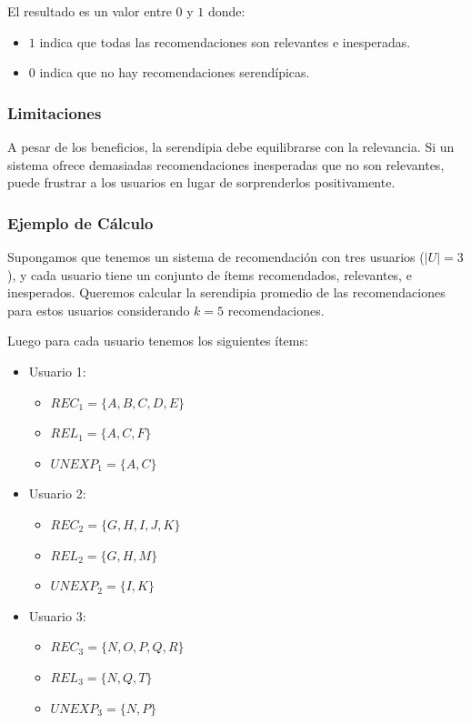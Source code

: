 \documentclass[11pt,a4paper,twoside]{thesis}
\begin{document}
El resultado es un valor entre $0$ y $1$ donde:
\begin{itemize}
	\item $1$ indica que todas las recomendaciones son relevantes e inesperadas.
	\item $0$ indica que no hay recomendaciones serendípicas.
\end{itemize}



\subsubsection*{Limitaciones}

A pesar de los beneficios, la serendipia debe equilibrarse con la relevancia. Si un sistema ofrece demasiadas recomendaciones inesperadas que no son relevantes, puede frustrar a los usuarios en lugar de sorprenderlos positivamente.


\subsubsection*{Ejemplo de Cálculo}

Supongamos que tenemos un sistema de recomendación con tres usuarios (\( |U| = 3 \)), y cada usuario tiene un conjunto de ítems recomendados, relevantes, e inesperados. Queremos calcular la serendipia promedio de las recomendaciones para estos usuarios considerando \( k = 5 \) recomendaciones.

Luego para cada usuario tenemos los siguientes ítems:
\begin{itemize}
	\item Usuario 1:
	      \begin{itemize}
		      \item $REC_1 = \{A, B, C, D, E\}$
		      \item $REL_1 = \{A, C, F\}$
		      \item $UNEXP_1 = \{A, C\}$
	      \end{itemize}
	\item Usuario 2:
	      \begin{itemize}
		      \item $REC_2 = \{G, H, I, J, K\}$
		      \item $REL_2 = \{G, H, M\}$
		      \item $UNEXP_2 = \{I, K\}$
	      \end{itemize}
	\item Usuario 3:
	      \begin{itemize}
		      \item $REC_3 = \{N, O, P, Q, R\}$
		      \item $REL_3 = \{N, Q, T\}$
		      \item $UNEXP_3 = \{N, P\}$
	      \end{itemize}
\end{itemize}
\end{document}
